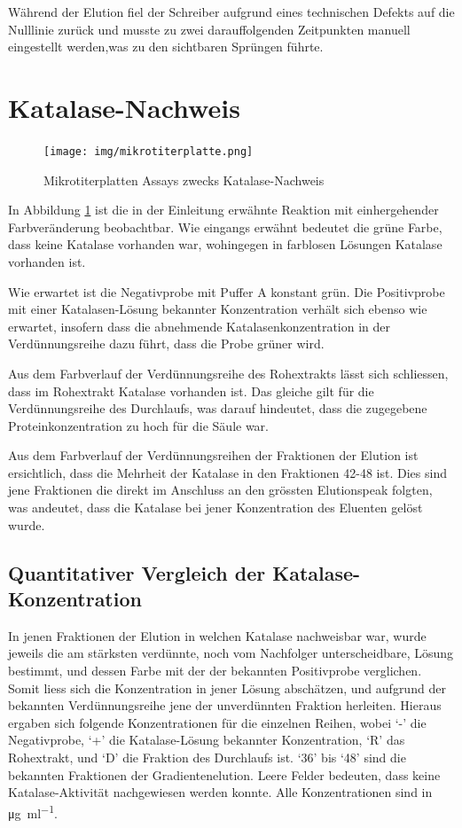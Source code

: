 \documentclass[a4paper,german]{scrreprt}
\begin{document}
Während der Elution fiel der Schreiber aufgrund eines technischen Defekts auf
die Nulllinie zurück und musste zu zwei darauffolgenden Zeitpunkten manuell
eingestellt werden,was zu den sichtbaren Sprüngen führte.

\section{Katalase-Nachweis}

\begin{figure}[h]
	\centering
	\texttt{[image: img/mikrotiterplatte.png]}
	\caption{Mikrotiterplatten Assays zwecks Katalase-Nachweis}
	\label{fig:katalase_nachweis}
\end{figure}

In Abbildung \ref{fig:katalase_nachweis} ist die in der Einleitung erwähnte
Reaktion mit einhergehender Farbveränderung beobachtbar. Wie eingangs erwähnt
bedeutet die grüne Farbe, dass keine Katalase vorhanden war, wohingegen in
farblosen Lösungen Katalase vorhanden ist.

Wie erwartet ist die Negativprobe mit Puffer A konstant grün. Die Positivprobe
mit einer Katalasen-Lösung bekannter Konzentration verhält sich ebenso wie
erwartet, insofern dass die abnehmende Katalasenkonzentration in der
Verdünnungsreihe dazu führt, dass die Probe grüner wird.

Aus dem Farbverlauf der Verdünnungsreihe des Rohextrakts lässt sich schliessen,
dass im Rohextrakt Katalase vorhanden ist. Das gleiche gilt für die
Verdünnungsreihe des Durchlaufs, was darauf hindeutet, dass die zugegebene
Proteinkonzentration zu hoch für die Säule war.

Aus dem Farbverlauf der Verdünnungsreihen der Fraktionen der Elution ist
ersichtlich, dass die Mehrheit der Katalase in den Fraktionen 42-48 ist. Dies
sind jene Fraktionen die direkt im Anschluss an den grössten Elutionspeak
folgten, was andeutet, dass die Katalase bei jener Konzentration des Eluenten
gelöst wurde.

\subsection{Quantitativer Vergleich der Katalase-Konzentration}

In jenen Fraktionen der Elution in welchen Katalase nachweisbar war, wurde
jeweils die am stärksten verdünnte, noch vom Nachfolger unterscheidbare, Lösung
bestimmt, und dessen Farbe mit der der bekannten Positivprobe verglichen.
Somit liess sich die Konzentration in jener Lösung abschätzen, und aufgrund der
bekannten Verdünnungsreihe jene der unverdünnten Fraktion herleiten. Hieraus
ergaben sich folgende Konzentrationen für die einzelnen Reihen, wobei `-' die
Negativprobe, `+' die Katalase-Lösung bekannter Konzentration, `R' das
Rohextrakt, und `D' die Fraktion des Durchlaufs ist. `36' bis `48' sind die
bekannten Fraktionen der Gradientenelution. Leere Felder bedeuten, dass keine
Katalase-Aktivität nachgewiesen werden konnte. Alle Konzentrationen sind in
\si{\ug \per \ml}.
\\
\end{document}
